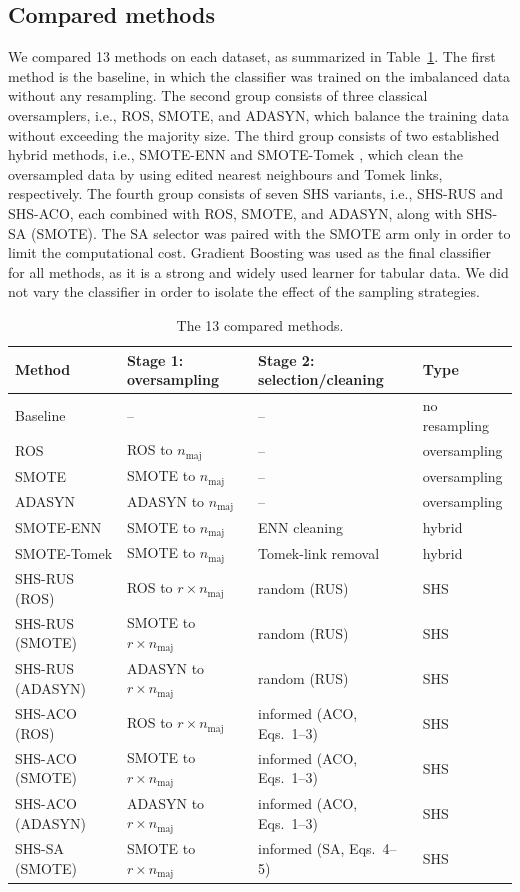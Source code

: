\documentclass[pdflatex,sn-basic]{sn-jnl}
\begin{document}
\subsection{Compared methods}
We compared 13 methods on each dataset, as summarized in
Table~\ref{tab:methods}. The first method is the
baseline, in which the classifier was trained on the imbalanced data
without any resampling. The second group consists of three classical
oversamplers, i.e., ROS, SMOTE, and ADASYN, which balance the training
data without exceeding the majority size. The third group consists of
two established hybrid methods, i.e., SMOTE-ENN and SMOTE-Tomek
\citep{batista2004study}, which clean the oversampled data by using
edited nearest neighbours and Tomek links, respectively. The fourth
group consists of seven SHS variants, i.e., SHS-RUS and SHS-ACO, each
combined with ROS, SMOTE, and ADASYN, along with SHS-SA (SMOTE). The SA
selector was paired with the SMOTE arm only in order to limit the
computational cost. Gradient Boosting \citep{friedman2001greedy} was used as the final
classifier for all methods, as it is a strong and widely used learner
for tabular data. We did not vary the
classifier in order to isolate the effect of the sampling strategies.

\begin{table}[htbp]
\centering
\caption{The 13 compared methods.}
\label{tab:methods}
\footnotesize
\begin{tabular}{llll}
\toprule
Method & Stage 1: oversampling & Stage 2: selection/cleaning & Type \\
\midrule
Baseline & -- & -- & no resampling \\
ROS & ROS to $n_{\mathrm{maj}}$ & -- & oversampling \\
SMOTE & SMOTE to $n_{\mathrm{maj}}$ & -- & oversampling \\
ADASYN & ADASYN to $n_{\mathrm{maj}}$ & -- & oversampling \\
SMOTE-ENN & SMOTE to $n_{\mathrm{maj}}$ & ENN cleaning & hybrid \\
SMOTE-Tomek & SMOTE to $n_{\mathrm{maj}}$ & Tomek-link removal & hybrid \\
SHS-RUS (ROS) & ROS to $r \times n_{\mathrm{maj}}$ & random (RUS) & SHS \\
SHS-RUS (SMOTE) & SMOTE to $r \times n_{\mathrm{maj}}$ & random (RUS) & SHS \\
SHS-RUS (ADASYN) & ADASYN to $r \times n_{\mathrm{maj}}$ & random (RUS) & SHS \\
SHS-ACO (ROS) & ROS to $r \times n_{\mathrm{maj}}$ & informed (ACO, Eqs.~1--3) & SHS \\
SHS-ACO (SMOTE) & SMOTE to $r \times n_{\mathrm{maj}}$ & informed (ACO, Eqs.~1--3) & SHS \\
SHS-ACO (ADASYN) & ADASYN to $r \times n_{\mathrm{maj}}$ & informed (ACO, Eqs.~1--3) & SHS \\
SHS-SA (SMOTE) & SMOTE to $r \times n_{\mathrm{maj}}$ & informed (SA, Eqs.~4--5) & SHS \\
\bottomrule
\end{tabular}
\end{table}
\end{document}

